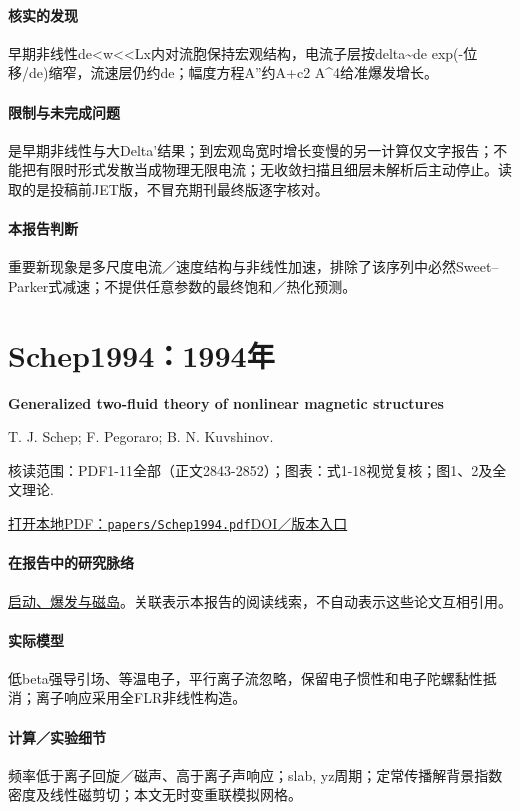 \paragraph{核实的发现}早期非线性de<w<<Lx内对流胞保持宏观结构，电流子层按delta\textasciitilde{}de exp(-位移/de)缩窄，流速层仍约de；幅度方程A''约A+c2 A\textasciicircum{}4给准爆发增长。

\paragraph{限制与未完成问题}是早期非线性与大Delta'结果；到宏观岛宽时增长变慢的另一计算仅文字报告；不能把有限时形式发散当成物理无限电流；无收敛扫描且细层未解析后主动停止。读取的是投稿前JET版，不冒充期刊最终版逐字核对。

\paragraph{本报告判断}重要新现象是多尺度电流／速度结构与非线性加速，排除了该序列中必然Sweet–Parker式减速；不提供任意参数的最终饱和／热化预测。

\section{Schep1994：1994年}\label{paper:Schep1994}

\textbf{Generalized two-fluid theory of nonlinear magnetic structures}\citep{Schep1994}\

T. J. Schep;  F. Pegoraro;  B. N. Kuvshinov.

\textsf{核读范围：}PDF1-11全部（正文2843-2852）；\textsf{图表：}式1-18视觉复核；图1、2及全文理论.

\href{run:papers/Schep1994.pdf}{打开本地PDF：\texttt{papers/Schep1994.pdf}}\quad\href{https://doi.org/10.1063/1.870523}{DOI／版本入口}

\paragraph{在报告中的研究脉络}\hyperref[story:onset]{启动、爆发与磁岛}。关联表示本报告的阅读线索，不自动表示这些论文互相引用。

\paragraph{实际模型}低beta强导引场、等温电子，平行离子流忽略，保留电子惯性和电子陀螺黏性抵消；离子响应采用全FLR非线性构造。

\paragraph{计算／实验细节}频率低于离子回旋／磁声、高于离子声响应；slab, yz周期；定常传播解背景指数密度及线性磁剪切；本文无时变重联模拟网格。

